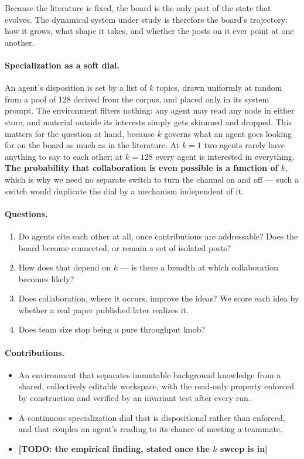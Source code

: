 \documentclass[sigconf,anonymous]{aamas}
\newcommand{\TODORESULT}[1]{\textbf{[TODO: #1]}}
\begin{document}
Because the literature is fixed, the board is the only part of the state that
evolves. The dynamical system under study is therefore the board's trajectory:
how it grows, what shape it takes, and whether the posts on it ever point at
one another.

\paragraph{Specialization as a soft dial.}
An agent's disposition is set by a list of $k$ topics, drawn uniformly at
random from a pool of 128 derived from the corpus, and placed only in its
system prompt. The environment filters nothing: any agent may read any node in
either store, and material outside its interests simply gets skimmed and
dropped. This matters for the question at hand, because $k$ governs what an
agent goes looking for on the board as much as in the literature. At $k{=}1$
two agents rarely have anything to say to each other; at $k{=}128$ every agent
is interested in everything. \textbf{The probability that collaboration is even
possible is a function of $k$}, which is why we need no separate switch to turn
the channel on and off --- such a switch would duplicate the dial by a
mechanism independent of it.

\paragraph{Questions.}
\begin{enumerate}
\item Do agents cite each other at all, once contributions are addressable?
  Does the board become connected, or remain a set of isolated posts?
\item How does that depend on $k$ --- is there a breadth at which collaboration
  becomes likely?
\item Does collaboration, where it occurs, improve the ideas? We score each
  idea by whether a real paper published later realizes it.
\item Does team size stop being a pure throughput knob?
\end{enumerate}

\paragraph{Contributions.}
\begin{itemize}
\item An environment that separates immutable background knowledge from a
  shared, collectively editable workspace, with the read-only property enforced
  by construction and verified by an invariant test after every run.
\item A continuous specialization dial that is dispositional rather than
  enforced, and that couples an agent's reading to its chance of meeting a
  teammate.
\item \TODORESULT{the empirical finding, stated once the $k$ sweep is in}
\end{itemize}
\end{document}
